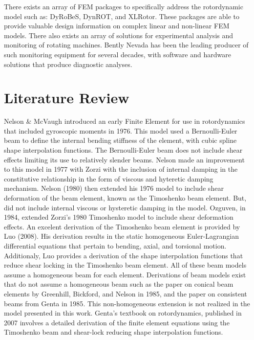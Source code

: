 There exists an array of FEM packages to specifically address the rotordynamic model such as: DyRoBeS, DynROT, and XLRotor. These packages are able to provide valuable design information on complex linear and non-linear FEM models. There also exists an array of solutions for experimental analysis and monitoring of rotating machines. Bently Nevada has been the leading producer of such monitoring equipment for several decades, with software and hardware solutions that produce diagnostic analyses.\par
\section{Literature Review}
Nelson \& McVaugh \cite{nelson1976dynamics} introduced an early Finite Element for use in rotordynamics that included gyroscopic moments in 1976. This model used a Bernoulli-Euler beam to define the internal bending stiffness of the element, with cubic spline shape interpolation functions. The Bernoulli-Euler beam does not include shear effects limiting its use to relatively slender beams. Nelson made an improvement to this model in 1977 with Zorzi \cite{zorzi1977finite} with the inclusion of internal damping in the constitutive relationship in the form of viscous and hyteretic damping mechanism. Nelson (1980)\cite{nelson1980finite} then extended his 1976 model to include shear deformation of the beam element, known as the Timoshenko beam element. But, did not include internal viscous or hysteretic damping in the model. Ozguven, in 1984\cite{ozguven1984whirl}, extended Zorzi's 1980 Timoshenko model to include shear deformation effects.  An excelent derivation of the Timoshenko beam element is provided by Luo (2008)\cite{luo2008efficient}. His derivation results in the static homogeneous Euler-Lagrangian differential equations that pertain to bending, axial, and torsional motion. Additionaly, Luo provides a derivation of the shape interpolation functions that reduce shear locking in the Timoshenko beam element. All of these beam models assume a homogeneous beam for each element. Derivations of beam models exist that do not assume a homogeneous beam such as the paper on conical beam elements by Greenhill, Bickford, and Nelson in 1985\cite{greenhill1985conical}, and the paper on consistent beams from Genta in 1985\cite{genta1985consistent}. This non-homogeneous extension is not realized in the model presented in this work. Genta's textbook on rotordynamics, published in 2007\cite{genta2007dynamics} involves a detailed derivation of the finite element equations using the Timoshenko beam and shear-lock reducing shape interpolation functions.\par 
